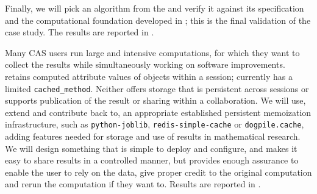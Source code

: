 \begin{workpackage}[id=dksbases,%
  title=Data/Knowledge/Software-Bases,lead=JU,
  ZHRM=12,JURM=46,UWRM=25,SARM=10,LLRM=2,PSRM=4]
\begin{tasklist}
\begin{task}[title=\LMFDB Case Study (Triformal Theories),id=data-LMFDB,
  lead=JU,partners={ZH,UW},PM=24,wphases={12-24!.25,24-48!.7}]
  Finally, we will pick an algorithm from the \LMFDB and verify it against its
  specification and the computational foundation developed in
  ; this is the final validation of the case study. The
  results are reported in .
  \end{task}

\begin{task}[title=Memoization and production of new data,id=data-memo,
  lead=SA,partners={US,PS,UW},PM=12,wphases=24-42!.6]
  Many CAS users run large and intensive computations, for which they want to collect the
  results while simultaneously working on software improvements. \GAP retains computed
  attribute values of objects within a session; \Sage currently has a limited
  \texttt{cached\_method}. Neither offers storage that is persistent across sessions or
  supports publication of the result or sharing within a collaboration. We will use,
  extend and contribute back to, an appropriate established persistent memoization
  infrastructure, such as \texttt{python-joblib}, \texttt{redis-simple-cache} or
  \texttt{dogpile.cache}, adding features needed for storage and use of results in
  mathematical research. We will design something that is simple to deploy and configure,
  and makes it easy to share results in a controlled manner, but provides enough assurance
  to enable the user to rely on the data, give proper credit to the original computation
  and rerun the computation if they want to. Results are reported in .

\end{task}


\end{tasklist}
\end{workpackage}
